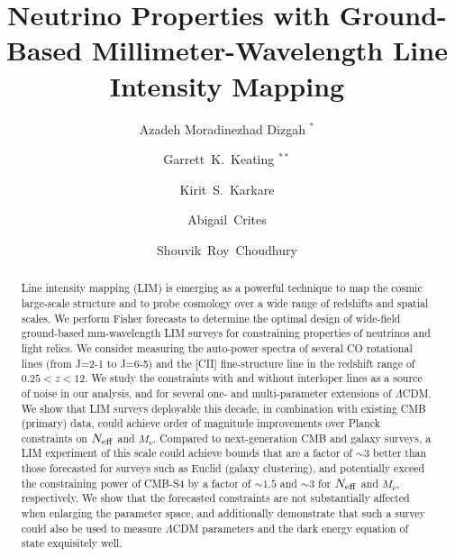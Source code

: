 \documentclass[twocolumn]{aastex631}
\begin{document}
 

\title{Neutrino Properties with Ground-Based Millimeter-Wavelength Line Intensity Mapping} 

\author{Azadeh Moradinezhad Dizgah $^{\ast}$}

\author{Garrett~K.~Keating $^{\ast \ast}$}

\author{Kirit~S.~Karkare}

\author{Abigail~Crites}

\author{Shouvik~Roy~Choudhury}




\begin{abstract}
Line intensity mapping (LIM) is emerging as a powerful technique to map the cosmic large-scale structure and to probe cosmology over a wide range of redshifts and spatial scales. We perform Fisher forecasts to determine the optimal design of wide-field ground-based mm-wavelength LIM surveys for constraining properties of neutrinos and light relics. We consider measuring the auto-power spectra of several CO rotational lines (from J=2-1 to J=6-5) and the [CII] fine-structure line in the redshift range of $0.25<z<12$. We study the constraints with and without interloper lines as a source of  noise in our analysis, and for several one- and multi-parameter extensions of $\Lambda$CDM. We show that LIM surveys deployable this decade, in combination with existing CMB (primary) data, could achieve  order of magnitude improvements over Planck constraints on $N_{\rm eff}$ and $M_\nu$. Compared to next-generation CMB and galaxy surveys, a LIM experiment of this scale could achieve bounds that are a factor of $\sim3$ better than those forecasted for surveys such as Euclid (galaxy clustering), and potentially exceed the constraining power of CMB-S4 by a factor of $\sim1.5$ and $\sim3$ for $N_{\rm eff}$ and $M_\nu$, respectively. We show that the forecasted constraints are not substantially affected when enlarging the parameter space, and additionally demonstrate that such a survey could also be used to measure $\Lambda$CDM parameters and the dark energy equation of state exquisitely well. \\
\end{abstract}
\end{document}
